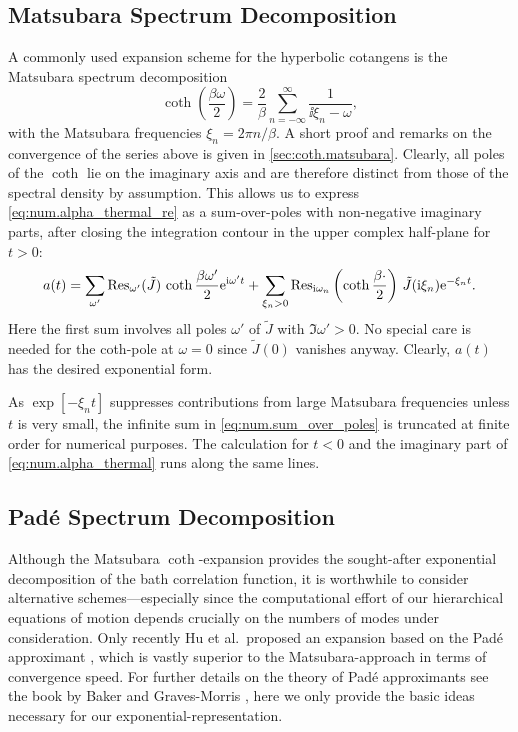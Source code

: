 \subsection{Matsubara Spectrum Decomposition}
\label{sub:num.expansion.matsubara}

A commonly used expansion scheme for the hyperbolic cotangens is the Matsubara spectrum decomposition \cite{Ma00_many_particle}
\begin{equation}
  \coth\left(\frac{\beta \omega}{2}\right) = \frac{2}{\beta} \sum_{n=-\infty}^\infty \frac{1}{\ii\xi_n - \omega},
  \label{eq:num.matsubara_expansion}
\end{equation}
with the Matsubara frequencies $\xi_n = 2\pi n / \beta$.
A short proof and remarks on the convergence of the series above is given in \autoref{sec:coth.matsubara}.
Clearly, all poles of the $\coth$ lie on the imaginary axis and are therefore distinct from those of the spectral density by assumption.
This allows us to express \autoref{eq:num.alpha_thermal_re} as a sum-over-poles with non-negative imaginary parts, after closing the integration contour in the upper complex half-plane for $t > 0$:
\begin{equation}
  a(t) = \sum_{\omega'} \Res_{\omega'}(\tilde J) \, \coth \frac{\beta \omega'}{2} \exp[\ii\omega' t]
  + \sum_{\xi_n > 0} \Res_{\ii\omega_n} \left(\coth \frac{\beta\cdot}{2} \right) \, \tilde J(\ii\xi_n) \exp[-\xi_n t].
  \label{eq:num.sum_over_poles}
\end{equation}
Here the first sum involves all poles $\omega'$ of $\tilde J$ with $\Im \omega' > 0$.
No special care is needed for the coth-pole at $\omega = 0$ since $\tilde J(0)$ vanishes anyway.
Clearly, $a(t)$ has the desired exponential form.

As $\exp[-\xi_n t]$ suppresses contributions from large Matsubara frequencies unless $t$ is very small, the infinite sum in \autoref{eq:num.sum_over_poles} is truncated at finite order for numerical purposes.
The calculation for $t < 0$ and the imaginary part of \autoref{eq:num.alpha_thermal} runs along the same lines.


\subsection{Padé Spectrum Decomposition}
\label{sub:num.expansion.pade}
%

Although the Matsubara $\coth$-expansion provides the sought-after exponential decomposition of the bath correlation function, it is worthwhile to consider alternative schemes---especially since the computational effort of our hierarchical equations of motion depends crucially on the numbers of modes under consideration.
Only recently Hu et al.\ proposed an expansion based on the Padé approximant \cite{HuXuYa10_pade,Hu11_pade}, which is vastly superior to the Matsubara-approach in terms of convergence speed.
For further details on the theory of Padé approximants see the book by Baker and Graves-Morris \cite{BaGr96_pade}, here we only provide the basic ideas necessary for our exponential-representation.

